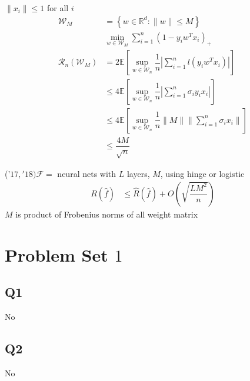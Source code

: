 \documentclass{article}
\begin{document}
$\| x_{i} \| \leq  1$ for all $i $
\begin{align*}
\mathcal{W}_{M} &= \left\{w \in \mathbb{R}^{d} : \| w \| \leq  M \right\}
\\ &\displaystyle\min_{w \in \mathcal{W}_{M}} \displaystyle\sum_{i=1}^{n} \left(1 - y_{i} w^{T} x_{i}\right)_{+}
\\ \mathcal{R}_{n}\left(\mathcal{W}_{M}\right) &= 2 \mathbb{E}\left[\displaystyle\sup_{w \in \mathcal{W}_{n}} \dfrac{1}{n} | \displaystyle\sum_{i=1}^{n} l\left(y_{i} w^{T} x_{i}\right) |\right]
\\ &\leq  4 \mathbb{E}\left[\displaystyle\sup_{w \in \mathcal{W}_{n}} \dfrac{1}{n} | \displaystyle\sum_{i=1}^{n} \sigma_{i} y_{i} x_{i} |\right]
\\ &\leq  4 \mathbb{E}\left[\displaystyle\sup_{w \in \mathcal{W}_{n}} \dfrac{1}{n} \| M \| \| \displaystyle\sum_{i=1}^{n} \sigma_{i} x_{i} \|\right]
\\ &\leq  \dfrac{4 M}{\sqrt{n}}
\end{align*}
\begin{thm} \label{thm:nnnew} 
('$17, '18) \mathcal{F} =$ neural nets with $L $ layers, $M $, using hinge or logistic
\begin{align*}
R\left(\hat{f}\right)  &\leq  \hat{R}\left(\hat{f}\right) + O\left(\sqrt{\dfrac{L M^{2}}{n}}\right)
\end{align*}
$M $ is product of Frobenius norms of all weight matrix
\end{thm}

\newpage




\section{Problem Set $1$} 


\subsection{Q1}
No



\subsection{Q2}
No
\end{document}
